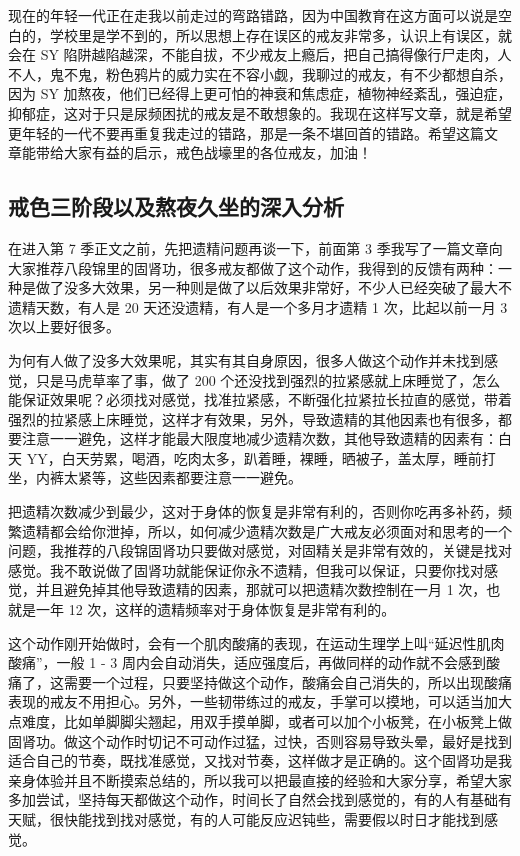 \documentclass[fontset=founder]{ctexart}
\begin{document}
现在的年轻一代正在走我以前走过的弯路错路，因为中国教育在这方面可以说是空白的，学校里是学不到的，所以思想上存在误区的戒友非常多，认识上有误区，就会在 SY 陷阱越陷越深，不能自拔，不少戒友上瘾后，把自己搞得像行尸走肉，人不人，鬼不鬼，粉色鸦片的威力实在不容小觑，我聊过的戒友，有不少都想自杀，因为 SY 加熬夜，他们已经得上更可怕的神衰和焦虑症，植物神经紊乱，强迫症，抑郁症，这对于只是尿频困扰的戒友是不敢想象的。我现在这样写文章，就是希望更年轻的一代不要再重复我走过的错路，那是一条不堪回首的错路。希望这篇文 章能带给大家有益的启示，戒色战壕里的各位戒友，加油！

\subsection{戒色三阶段以及熬夜久坐的深入分析}

在进入第 7 季正文之前，先把遗精问题再谈一下，前面第 3 季我写了一篇文章向大家推荐八段锦里的固肾功，很多戒友都做了这个动作，我得到的反馈有两种：一种是做了没多大效果，另一种则是做了以后效果非常好，不少人已经突破了最大不遗精天数，有人是 20 天还没遗精，有人是一个多月才遗精 1 次，比起以前一月 3 次以上要好很多。

为何有人做了没多大效果呢，其实有其自身原因，很多人做这个动作并未找到感觉，只是马虎草率了事，做了 200 个还没找到强烈的拉紧感就上床睡觉了，怎么能保证效果呢？必须找对感觉，找准拉紧感，不断强化拉紧拉长拉直的感觉，带着强烈的拉紧感上床睡觉，这样才有效果，另外，导致遗精的其他因素也有很多，都要注意一一避免，这样才能最大限度地减少遗精次数，其他导致遗精的因素有：白天 YY，白天劳累，喝酒，吃肉太多，趴着睡，裸睡，晒被子，盖太厚，睡前打坐，内裤太紧等，这些因素都要注意一一避免。

把遗精次数减少到最少，这对于身体的恢复是非常有利的，否则你吃再多补药，频繁遗精都会给你泄掉，所以，如何减少遗精次数是广大戒友必须面对和思考的一个问题，我推荐的八段锦固肾功只要做对感觉，对固精关是非常有效的，关键是找对感觉。我不敢说做了固肾功就能保证你永不遗精，但我可以保证，只要你找对感觉，并且避免掉其他导致遗精的因素，那就可以把遗精次数控制在一月 1 次，也就是一年 12 次，这样的遗精频率对于身体恢复是非常有利的。

这个动作刚开始做时，会有一个肌肉酸痛的表现，在运动生理学上叫“延迟性肌肉酸痛”，一般 1 - 3 周内会自动消失，适应强度后，再做同样的动作就不会感到酸痛了，这需要一个过程，只要坚持做这个动作，酸痛会自己消失的，所以出现酸痛表现的戒友不用担心。另外，一些韧带练过的戒友，手掌可以摸地，可以适当加大点难度，比如单脚脚尖翘起，用双手摸单脚，或者可以加个小板凳，在小板凳上做固肾功。做这个动作时切记不可动作过猛，过快，否则容易导致头晕，最好是找到适合自己的节奏，既找准感觉，又找对节奏，这样做才是正确的。这个固肾功是我亲身体验并且不断摸索总结的，所以我可以把最直接的经验和大家分享，希望大家多加尝试，坚持每天都做这个动作，时间长了自然会找到感觉的，有的人有基础有天赋，很快能找到找对感觉，有的人可能反应迟钝些，需要假以时日才能找到感觉。
\end{document}
